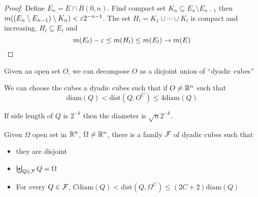 \begin{proof}
  Define $E_n = E \cap \overline{B}(0, n)$. Find compact set $K_n \subseteq E_n \setminus E_{n-1}$ then
  $m((E_n \setminus E_{n-1})\setminus K_n) < \varepsilon 2^{-n-1}$.
  The set $H_l = K_1 \cup \cdots \cup K_l$ is compact and increasing, $H_l \subseteq E_l$ and 
  \[m(E_l) - \varepsilon \le m(H_l) \le m(E_l) \to m(E)\]
\end{proof}

\begin{theorem}
  Given an open set $O$, we can decompose $O$ as a disjoint union of ``dyadic cubes''
\end{theorem}

\begin{theorem}
  We can choose the cubes a dyadic cubes such that if $O \neq \mathbb R^n$ such that 
  \[\mathrm{diam}(Q)<\mathrm{dist}(Q, O^C) \le 4 \mathrm{diam}(Q)\]
\end{theorem}

\begin{remark}
  If side length of $Q$ is $2^{-k}$ then the diameter is $\sqrt{n}2^{-k}$.
\end{remark}

\begin{theorem}
  Given $\Omega$ open set in $\mathbb R^n$, $\Omega \neq \mathbb R^n$,
  there is a family $\mathcal F$ of dyadic cubes such that
  \begin{itemize}
    \item they are disjoint
    \item $\biguplus_{Q \in \mathcal F}Q = \Omega$
    \item For every $Q \in \mathcal F$, $C\mathrm{diam}(Q) < \mathrm{dist}(Q, \Omega^C) \le (2C+2)\mathrm{diam}(Q)$
  \end{itemize}  
\end{theorem}


